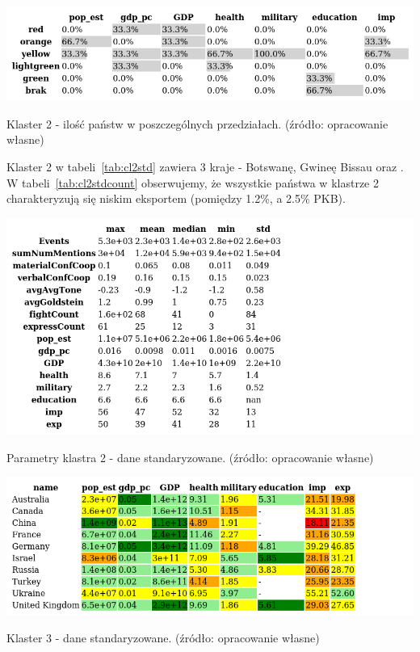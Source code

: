 \documentclass[11pt]{report}
\begin{document}
    \begin{table}[!htp]
        \centering
        \includegraphics[width=\linewidth]{tables/CLUST/cluster2stdkmeanscount.png}
        \caption{Klaster 2 - ilość państw w poszczególnych przedziałach. (źródło: opracowanie własne)}
        \label{tab:cl2stdcount}
    \end{table}

    Klaster 2 w tabeli~\ref{tab:cl2std} zawiera 3 kraje - Botswanę, Gwineę Bissau oraz .
    W tabeli~\ref{tab:cl2stdcount} obserwujemy, że wszystkie państwa w klastrze 2 charakteryzują się niskim eksportem (pomiędzy 1.2\%, a 2.5\% PKB).

    \begin{table}[!htp]
        \centering
        \includegraphics[width=\linewidth]{tables/CLUST/desc/clust2std_desc.png}
        \caption{Parametry klastra 2 - dane standaryzowane. (źródło: opracowanie własne)}
        \label{tab:cl2std_desc}
    \end{table}

    \begin{table}[!htp]
        \centering
        \includegraphics[width=\linewidth]{tables/CLUST/cluster3stdkmeans.png}
        \caption{Klaster 3 - dane standaryzowane. (źródło: opracowanie własne)}
        \label{tab:cl3std}
    \end{table}
\end{document}
